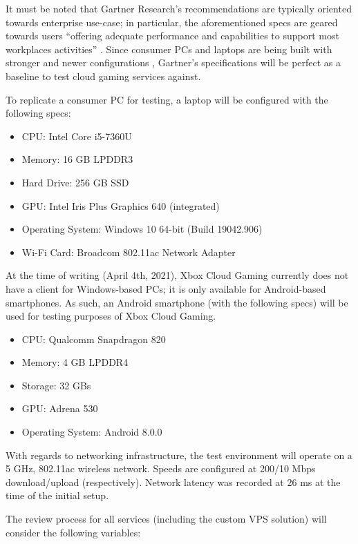 \documentclass[titlepage, 12pt]{article}
\begin{document}
	It must be noted that Gartner Research’s recommendations are typically oriented towards enterprise use-case; in particular, the aforementioned specs are geared towards users “offering adequate performance and capabilities to support most workplaces activities” \citep{gartner}. Since consumer PCs and laptops are being built with stronger and newer configurations \citep{pcworld2}, Gartner’s specifications will be perfect as a baseline to test cloud gaming services against.
	
	To replicate a consumer PC for testing, a laptop will be configured with the following specs:
	
	\begin{itemize}
	\item {CPU: Intel Core i5-7360U}
	\item {Memory: 16 GB LPDDR3}
	\item {Hard Drive: 256 GB SSD}
	\item {GPU: Intel Iris Plus Graphics 640 (integrated)}
	\item {Operating System: Windows 10 64-bit (Build 19042.906)}
	\item {Wi-Fi Card: Broadcom 802.11ac Network Adapter}
	\end{itemize}
	
	At the time of writing (April 4th, 2021), Xbox Cloud Gaming currently does not have a client for Windows-based PCs; it is only available for Android-based smartphones. As such, an Android smartphone (with the following specs) will be used for testing purposes of Xbox Cloud Gaming.
	
	\begin{itemize}
	\item {CPU: Qualcomm Snapdragon 820}
	\item {Memory: 4 GB LPDDR4}
	\item {Storage: 32 GBs}
	\item {GPU: Adrena 530}
	\item {Operating System: Android 8.0.0}
	\end{itemize}
	
	With regards to networking infrastructure, the test environment will operate on a 5 GHz, 802.11ac wireless network. Speeds are configured at 200/10 Mbps download/upload (respectively). Network latency was recorded at 26 ms at the time of the initial setup.
	
	The review process for all services (including the custom VPS solution) will consider the following variables:
	
\end{document}

